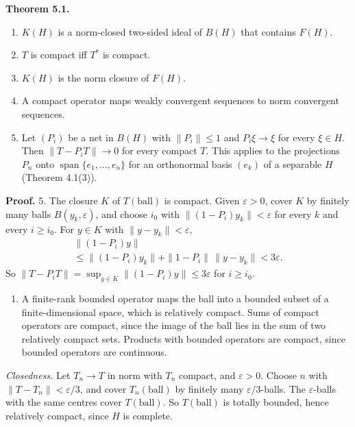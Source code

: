 \documentclass[
  english,
  11pt,
  a4paper,
]{article}
\providecommand{\tightlist}{%
  \setlength{\itemsep}{0pt}\setlength{\parskip}{0pt}}
\begin{document}
\textbf{Theorem 5.1.}

\begin{enumerate}
\tightlist
\item
  \(K(H)\) is a norm-closed two-sided ideal of \(B(H)\) that contains
  \(F(H)\).
\item
  \(T\) is compact iff \(T^*\) is compact.
\item
  \(K(H)\) is the norm closure of \(F(H)\).
\item
  A compact operator maps weakly convergent sequences to norm convergent
  sequences.
\item
  Let \((P_i)\) be a net in \(B(H)\) with \(\|P_i\|\le1\) and
  \(P_i\xi\to\xi\) for every \(\xi\in H\). Then \(\|T-P_iT\|\to0\) for
  every compact \(T\). This applies to the projections \(P_n\) onto
  \(\operatorname{span}\{e_1,\dots,e_n\}\) for an orthonormal basis
  \((e_k)\) of a separable \(H\) (Theorem 4.1(3)).
\end{enumerate}

\textbf{Proof.} 5. The closure \(K\) of \(T(\text{ball})\) is compact.
Given \(\varepsilon>0\), cover \(K\) by finitely many balls
\(B(y_k,\varepsilon)\), and choose \(i_0\) with
\(\|(1-P_i)y_k\|<\varepsilon\) for every \(k\) and every \(i\ge i_0\).
For \(y\in K\) with \(\|y-y_k\|<\varepsilon\), \[\begin{gathered}
\|(1-P_i)y\|\\
\le\|(1-P_i)y_k\|+\|1-P_i\|\,\|y-y_k\|<3\varepsilon .
\end{gathered}\] So
\(\|T-P_iT\|=\sup_{y\in K}\|(1-P_i)y\|\le3\varepsilon\) for
\(i\ge i_0\).

\begin{enumerate}
\tightlist
\item
  A finite-rank bounded operator maps the ball into a bounded subset of
  a finite-dimensional space, which is relatively compact. Sums of
  compact operators are compact, since the image of the ball lies in the
  sum of two relatively compact sets. Products with bounded operators
  are compact, since bounded operators are continuous.
\end{enumerate}

\emph{Closedness.} Let \(T_n\to T\) in norm with \(T_n\) compact, and
\(\varepsilon>0\). Choose \(n\) with \(\|T-T_n\|<\varepsilon/3\), and
cover \(T_n(\text{ball})\) by finitely many \(\varepsilon/3\)-balls. The
\(\varepsilon\)-balls with the same centres cover \(T(\text{ball})\). So
\(T(\text{ball})\) is totally bounded, hence relatively compact, since
\(H\) is complete.
\end{document}
